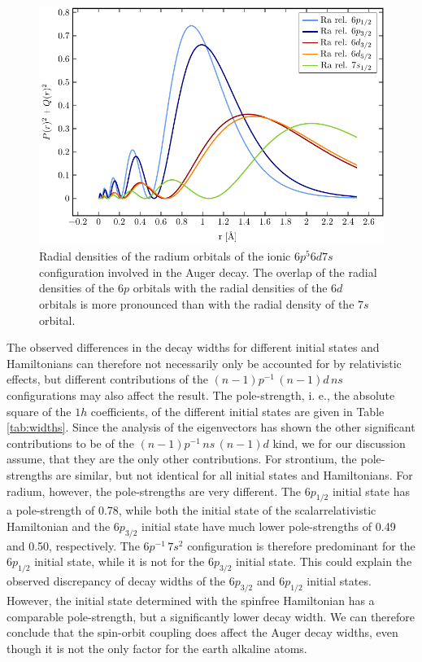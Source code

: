 \begin{figure}[h]
 \centering
 \includegraphics[width=\columnwidth]{pics/ra_6d_R.pdf}
 \caption{Radial densities of the radium orbitals of the ionic $6p^5 6d 7s$
          configuration involved in the Auger decay. The overlap of the radial
          densities of the $6p$ orbitals with the radial densities of the $6d$ orbitals
          is more pronounced than with the radial density of the $7s$ orbital.}
 \label{fig:radial_ra}
\end{figure}

The observed differences in the decay widths for different initial states and
Hamiltonians can therefore not necessarily only be accounted for by relativistic
effects, but different contributions of the $(n-1)p^{-1} \,(n-1)d \, ns$
configurations may also affect the result.
The pole-strength, i. e., the absolute square of the $1h$ coefficients,
of the different initial states are
given in Table \ref{tab:widths}.
Since the analysis of the eigenvectors has shown the other significant contributions
to be of the $(n-1)p^{-1} \,ns \, (n-1)d$ kind, we for our discussion assume, that
they are the only other contributions.
For strontium, the pole-strengths are similar, but not identical for all initial
states and Hamiltonians. For radium, however, the pole-strengths are very different.
The $6p_{1/2}$ initial state has a pole-strength of 0.78, while both the
initial state of the scalarrelativistic Hamiltonian and the $6p_{3/2}$ initial
state have much lower pole-strengths of 0.49 and 0.50, respectively.
The $6p^{-1} \,7s^2$ configuration is therefore predominant for the $6p_{1/2}$
initial state, while it is not for the $6p_{3/2}$ initial state. This could
explain the observed discrepancy of decay widths of the $6p_{3/2}$ and
$6p_{1/2}$ initial states. However, the initial state determined with the spinfree
Hamiltonian has a comparable pole-strength, but a significantly lower decay
width. We can therefore conclude that the spin-orbit coupling does affect
the Auger decay widths, even though it is not the only factor for the
earth alkaline atoms.


